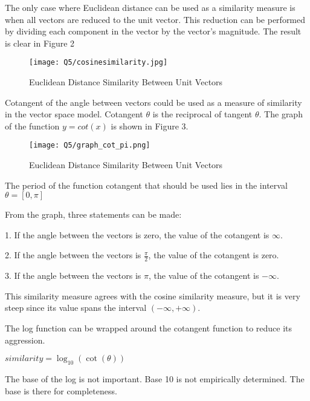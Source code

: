 The only case where Euclidean distance can be used as a similarity measure is when all vectors are reduced to the unit vector. This reduction can be performed by dividing each component in the vector by the vector's magnitude. The result is clear in Figure 2

\begin{figure}[h]
\caption{Euclidean Distance Similarity Between Unit Vectors}
\centering
\texttt{[image: Q5/cosinesimilarity.jpg]}
\end{figure}

Cotangent of the angle between vectors could be used as a measure of similarity in the vector space model. Cotangent $\theta$ is the reciprocal of tangent $\theta$. The graph of the function $y = cot(x)$ is shown in Figure 3.

\begin{figure}[h]
\caption{Euclidean Distance Similarity Between Unit Vectors}
\centering
\texttt{[image: Q5/graph\_cot\_pi.png]}
\end{figure}

The period of the function cotangent that should be used lies in the interval $\theta = [0,\pi]$

From the graph, three statements can be made:

1. If the angle between the vectors is zero, the value of the cotangent is $\infty$.

2. If the angle between the vectors is $\frac{\pi}{2}$, the value of the cotangent is zero.

3. If the angle between the vectors is $\pi$, the value of the cotangent is $-\infty$.

This similarity measure agrees with the cosine similarity measure, but it is very steep since its value spans the interval $(-\infty,+\infty)$.

The log function can be wrapped around the cotangent function to reduce its aggression. 

$ similarity = \log_{10} (\cot(\theta))$

The base of the log is not important. Base 10 is not empirically determined. The base is there for completeness.



 
